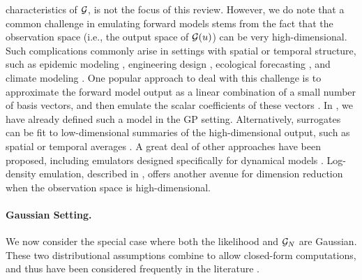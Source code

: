 \documentclass[12pt]{article}
\begin{document}
characteristics of $\fwd$, is not the focus of this review. However, we do note that 
a common challenge in emulating forward models stems from the fact that the observation 
space (i.e., the output space of $\fwd(\Par)$) can be very high-dimensional. 
Such complications commonly arise in settings with spatial or temporal structure, 
such as epidemic modeling \citep{FadikarAgentBased},
engineering design \citep{PODemulation}, ecological forecasting 
\citep{emPostDens,DagonCLM}, and climate modeling \citep{ESM_modeling_2pt0,idealizedGCM}.
One popular approach to deal with this challenge is to approximate the forward model output
as a linear combination of a small number of basis vectors, and then emulate the scalar coefficients 
of these vectors \citep{HigdonBasis,FadikarAgentBased,PODemulation}. In , 
we have already defined such a model in the GP setting.
Alternatively, surrogates 
can be fit to low-dimensional summaries of the high-dimensional output, such as spatial or 
temporal averages \citep{ESM_modeling_2pt0,idealizedGCM,CLMBayesianCalibration,CLMSurrogates}.
A great deal of other approaches have been proposed, including emulators designed 
specifically for dynamical models \citep{GP_dynamic_emulation, Bayesian_emulation_dynamic, Liu_West_dynamic_emulation, dynamic_nonlinear_simulators_GP}.
Log-density emulation, described in , offers another avenue for 
dimension reduction when the observation space is high-dimensional.

\paragraph{Gaussian Setting.}
We now consider the special case where both the likelihood and $\fwdEm[\Ndesign]$ are Gaussian.
These two distributional assumptions combine to allow closed-form computations, and thus have 
been considered frequently in the literature \citep{StuartTeck1,GP_PDE_priors,hydrologicalModel,Surer2023sequential,VillaniAdaptiveGP,weightedIVAR,idealizedGCM,CES}.
\end{document}
